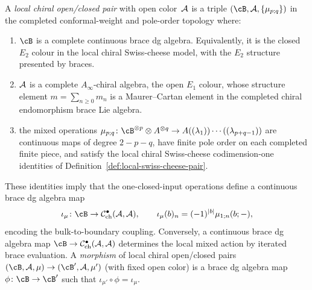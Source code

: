 \begin{definition}
\label{def:thqg-local-oc-pair}
A \emph{local chiral open/closed pair} with open color~$\mathcal{A}$
is a triple $(\cB, \cA, \{\mu_{p;q}\})$ in the completed
conformal-weight and pole-order topology where:
\begin{enumerate}[label=\textup{(\alph*)}]
\item $\cB$ is a complete continuous brace dg algebra. Equivalently,
 it is the closed $E_2$ colour in the local chiral Swiss-cheese
 model, with the $E_2$ structure presented by braces.
\item $\mathcal{A}$ is a complete $A_\infty$-chiral algebra, the open
 $E_1$ colour, whose structure element
 $m=\sum_{n\geq 0}m_n$ is a Maurer--Cartan element in the
 completed chiral endomorphism brace Lie algebra.
\item the mixed operations
 $\mu_{p;q}\colon \cB^{\otimes p}\otimes A^{\otimes q}
 \to A((\lambda_1))\cdots((\lambda_{p+q-1}))$
 are continuous maps of degree $2-p-q$, have finite pole order on
 each completed finite piece, and satisfy the local chiral
 Swiss-cheese codimension-one identities of
 Definition~\ref{def:local-swiss-cheese-pair}.
\end{enumerate}
These identities imply that the one-closed-input operations define
a continuous
brace dg algebra map
\[
\iota_\mu\colon \cB\to
\mathcal{C}^{\bullet}_{\mathrm{ch}}(\cA,\cA),
\qquad
\iota_\mu(b)_n=(-1)^{|b|}\mu_{1;n}(b;-),
\]
encoding the bulk-to-boundary coupling.
Conversely, a continuous brace dg algebra map
$\cB\to\mathcal{C}^{\bullet}_{\mathrm{ch}}(\cA,\cA)$ determines
the local mixed action by iterated brace evaluation.
A \emph{morphism} of local chiral open/closed pairs
$(\cB, \cA, \mu) \to (\cB', \cA, \mu')$ (with fixed open color)
is a brace dg algebra map $\phi \colon \cB \to \cB'$ such that
$\iota_{\mu'} \circ \phi = \iota_\mu$.
\end{definition}

